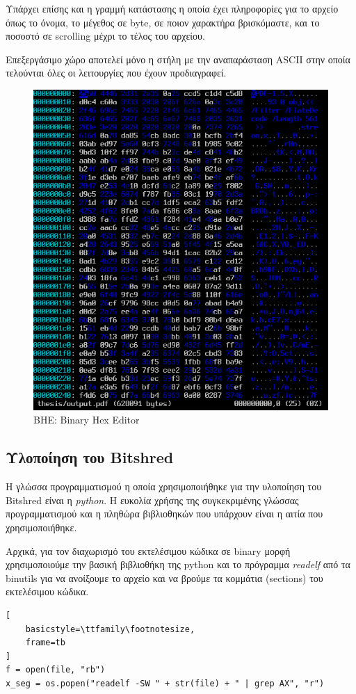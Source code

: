 Υπάρχει επίσης και η γραμμή κατάστασης η οποία έχει πληροφορίες για το αρχείο όπως το όνομα, το μέγεθος σε byte, σε ποιον χαρακτήρα βρισκόμαστε, και το ποσοστό σε scrolling μέχρι το τέλος του αρχείου.

Επεξεργάσιμο χώρο αποτελεί μόνο η στήλη με την αναπαράσταση ASCII στην οποία τελούνται όλες οι λειτουργίες που έχουν προδιαγραφεί.

\begin{figure}[ht]
\centering
\includegraphics[scale=0.5]{static/be.png}
\caption{BHE: Binary Hex Editor}
\label{be}
\end{figure}

\pagebreak
\subsection{Υλοποίηση του Bitshred}
Η γλώσσα προγραμματισμού η οποία χρησιμοποιήθηκε για την υλοποίηση του Bitshred είναι η \emph{python}.
Η ευκολία χρήσης της συγκεκριμένης γλώσσας προγραμματισμού και η πληθώρα βιβλιοθηκών που υπάρχουν  είναι η αιτία που χρησιμοποιήθηκε.

Αρχικά, για τον διαχωρισμό του εκτελέσιμου κώδικα σε binary μορφή χρησιμοποιούμε την βασική βιβλιοθήκη της python και το πρόγραμμα \emph{readelf} από τα binutils για να ανοίξουμε το αρχείο και να βρούμε τα κομμάτια (sections) του εκτελέσιμου κώδικα.
\begin{lstlisting}[
    basicstyle=\ttfamily\footnotesize,
    frame=tb
]
f = open(file, "rb")
x_seg = os.popen("readelf -SW " + str(file) + " | grep AX", "r")
\end{lstlisting}

